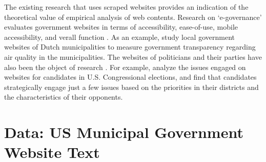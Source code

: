 \documentclass[11pt]{article}
\begin{document}
The existing research that uses scraped websites provides an indication of the theoretical value of empirical analysis of web contents. Research on `e-governance' evaluates government websites in terms of accessibility, ease-of-use, mobile accessibility, and  verall function \citep[e.g., ][]{Urban2002,mcneal2003innovating,tolbert2008institutions,mcnutt2010virtual,Armstrong2011,Feeney2017,mossey2019harnessing}. As an example, \cite{grimmelikhuijsen2012developing} study local government websites of Dutch municipalities to measure government transparency regarding air quality in the municipalities. The websites of politicians and their parties have also been the object of research \citep{Druckman2009,Druckman2010,cryer2019navigating,Esterling2011,Esterling2011a,Norris2003,Therriault2010}. For example, \cite{Druckman2010} analyze the issues engaged on websites for candidates in U.S. Congressional elections, and find that candidates strategically engage just a few issues based on the priorities in their districts and the characteristics of their opponents.  


\vspace{-.2cm}

\section{Data: US Municipal Government Website Text} \vspace{-.2cm}
\end{document}

